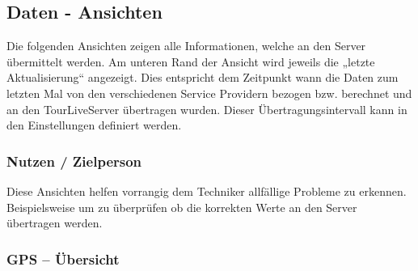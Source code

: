 \begin{longtable}{p{4cm} p{8cm}}
\end{longtable}



\subsection{Daten - Ansichten}
Die folgenden Ansichten zeigen alle Informationen, welche an den Server übermittelt werden. Am unteren Rand der Ansicht wird jeweils die „letzte Aktualisierung“ angezeigt. Dies entspricht dem Zeitpunkt wann die Daten zum letzten Mal von den verschiedenen Service Providern bezogen bzw. berechnet und an den TourLiveServer übertragen wurden. Dieser Übertragungsintervall kann in den Einstellungen definiert werden.

\subsubsection{Nutzen / Zielperson}
Diese Ansichten helfen vorrangig dem Techniker allfällige Probleme zu erkennen. Beispielsweise um zu überprüfen ob  die korrekten Werte an den Server übertragen werden.

\subsubsection{GPS – Übersicht}

